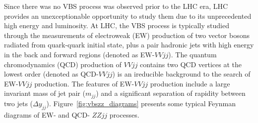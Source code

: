 Since there was no VBS process was observed prior to the LHC era, LHC provides an unexceptionable opportunity to study them due to its unprecedented high energy and luminosity.
At LHC, the VBS process is typically studied through the measurements of electroweak (EW) production of two vector bosons radiated from quark-quark initial state, 
plus a pair hadronic jets with high energy in the back and forward regions (denoted as EW-$VVjj$).
The quantum chromodynamics (QCD) production of $VVjj$ contains two QCD vertices at the lowest order (denoted as QCD-$VVjj$) is an ireducible background to the search of EW-$VVjj$ production.
The features of EW-$VVjj$ production include a large invariant mass of jet pair ($m_{jj}$) and a significant separation of rapidity between two jets ($\Delta y_{jj}$).
Figure~\ref{fig:vbszz_diagrams} presents some typical Feynman diagrams of EW- and QCD- $ZZjj$ processes.
